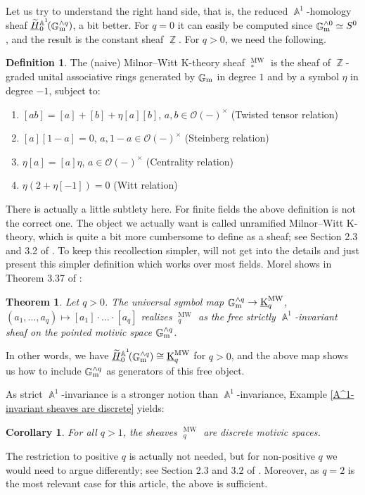 \documentclass[english]{amsart}
\newtheorem{thm}[prop]{Theorem}
\newtheorem{cor}[prop]{Corollary}
\theoremstyle{definition}
\newtheorem{de}[prop]{Definition}
\DeclareMathOperator{\Z}{\mathbb{Z}}
\DeclareMathOperator{\A}{\mathbb{A}}
\DeclareMathOperator{\G}{\mathbb{G}}
\DeclareMathOperator{\KK}{\underline{K}}
\DeclareMathOperator{\MW}{MW}
\begin{document}
Let us try to understand the right hand side, that is, the reduced $\A^1$-homology sheaf $\widetilde{\phantom{H}}\hspace{-9.5pt}\underline{H}_0^{\A^1}\!(\G_{\rm m}^{\wedge q})$, a bit better. For $q = 0$ it can easily be computed since $\G_{\rm m}^{\wedge 0} \simeq S^0$, and the result is the constant sheaf $\underline{\Z}$. For $q > 0$, we need the following.
\begin{de}\label{Def of KMW}
The (naive) Milnor--Witt K-theory sheaf $\KK^{\MW}_*$ is the sheaf of $\Z$-graded unital associative rings generated by $\G_{\rm m}$ in degree $1$ and by a symbol $\eta$ in degree $-1$, subject to:
\begin{enumerate}
\item[(i)] $[ab] = [a] + [b] + \eta[a][b]$, $a,b \in \mathcal{O}(-)^\times$ \hfill (Twisted tensor relation)
\item[(ii)] $[a][1-a] = 0$, $a, 1-a \in \mathcal{O}(-)^\times$ \hfill (Steinberg relation)
\item[(iii)] $\eta[a] = [a]\eta$, $a \in \mathcal{O}(-)^\times$ \hfill (Centrality relation)
\item[(iv)] $\eta(2 + \eta[-1]) = 0$ \hfill (Witt relation)
\end{enumerate}
\end{de}
There is actually a little subtlety here. For finite fields the above definition is not the correct one. The object we actually want is called unramified Milnor--Witt K-theory, which is quite a bit more cumbersome to define as a sheaf; see Section 2.3 and 3.2 of \cite{MR2934577}. To keep this recollection simpler, will not get into the details and just present this simpler definition which works over most fields. Morel shows in Theorem 3.37 of \cite{MR2934577}:

\begin{thm}\label{Milnor--Witt K-theory as Free Object}
Let $q > 0$. The universal symbol map $\G_{\rm m}^{\wedge q} \rightarrow \KK^{\MW}_q$, $(a_1,\dotsc,a_q) \mapsto [a_1]\cdot \dotsc \cdot [a_q]$ realizes $\KK^{\MW}_q$ as the free strictly $\A^1$-invariant sheaf on the pointed motivic space $\G_{\rm m}^{\wedge q}$.
\end{thm}
In other words, we have $\widetilde{\phantom{H}}\hspace{-9.5pt}\underline{H}_0^{\A^1}\!(\G_{\rm m}^{\wedge q}) \cong \KK^{\MW}_q$ for $q > 0$, and the above map shows us how to include $\G_{\rm m}^{\wedge q}$ as generators of this free object.

As strict $\A^1$-invariance is a stronger notion than $\A^1$-invariance, Example \ref{A^1-invariant sheaves are discrete} yields:
\begin{cor}\label{KMW discrete}
For all $q > 1$, the sheaves $\KK^{\MW}_q$ are discrete motivic spaces.
\end{cor}
The restriction to positive $q$ is actually not needed, but for non-positive $q$ we would need to argue differently; see Section 2.3 and 3.2 of \cite{MR2934577}. Moreover, as $q = 2$ is the most relevant case for this article, the above is sufficient.
\end{document}
